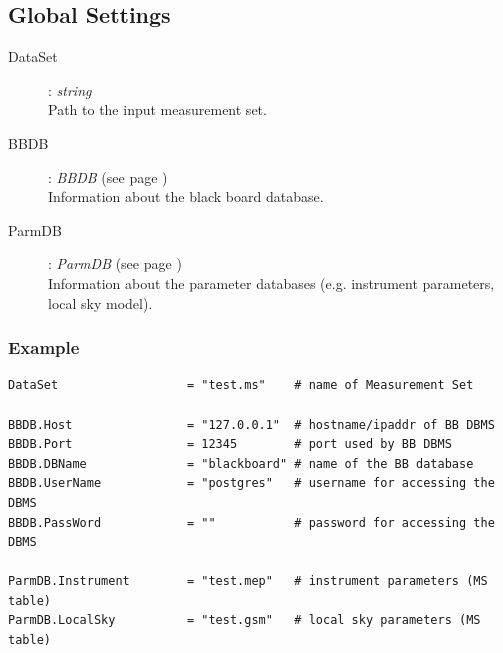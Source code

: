 \documentclass[10pt]{lofar}
\begin{document}
\subsection*{Global Settings}
\begin{description}
\item [DataSet] : \emph{string} \\
    Path to the input measurement set.
\item [BBDB] : \emph{BBDB} (see page \pageref{app-bbdb}) \\
    Information about the black board database.
\item [ParmDB] : \emph{ParmDB} (see page \pageref{app-parmdb}) \\
    Information about the parameter databases (e.g. instrument parameters,
    local sky model).
\end{description}

\subsubsection*{Example}
{\footnotesize
\begin{verbatim}
DataSet                  = "test.ms"    # name of Measurement Set

BBDB.Host                = "127.0.0.1"  # hostname/ipaddr of BB DBMS
BBDB.Port                = 12345        # port used by BB DBMS
BBDB.DBName              = "blackboard" # name of the BB database
BBDB.UserName            = "postgres"   # username for accessing the DBMS
BBDB.PassWord            = ""           # password for accessing the DBMS

ParmDB.Instrument        = "test.mep"   # instrument parameters (MS table)
ParmDB.LocalSky          = "test.gsm"   # local sky parameters (MS table)
\end{verbatim}
}
\end{document}
